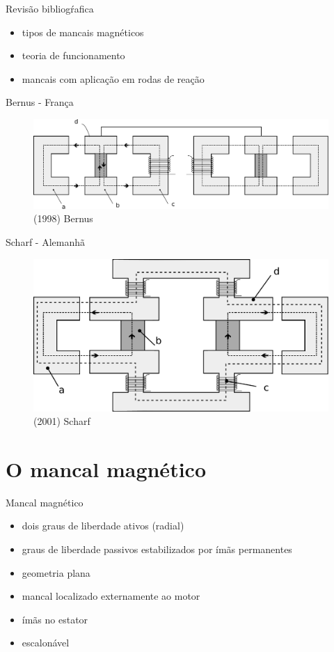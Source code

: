 \documentclass{beamer}
\begin{document}
\begin{frame}{Revisão bibliogŕafica}
	\begin{itemize}
		\item tipos de mancais magnéticos
		\item teoria de funcionamento
		\item mancais com aplicação em rodas de reação
	\end{itemize}	
\end{frame}

\begin{frame}{Bernus - França}
	\begin{figure}
		\centering
		\includegraphics[width=1\linewidth]{../../Dissertacao/Figs/mancais/frances}
		{\caption*{(1998) Bernus}}
	\end{figure}
\end{frame}	

\begin{frame}{Scharf - Alemanhã}
	\begin{figure}
		\centering
	\includegraphics[width=0.7\linewidth]{../../Dissertacao/Figs/mancais/alemao.pdf}
		{\caption*{(2001) Scharf}}
	\end{figure}
\end{frame}	


\section{O mancal magnético}

\begin{frame}{Mancal magnético}
	\begin{itemize}
		\item dois graus de liberdade ativos (radial)
		\item graus de liberdade passivos estabilizados por ímãs permanentes
		\item geometria plana
		\item mancal localizado externamente ao motor
		\item ímãs no estator
		\item escalonável 
	\end{itemize}	
\end{frame}
\end{document}
